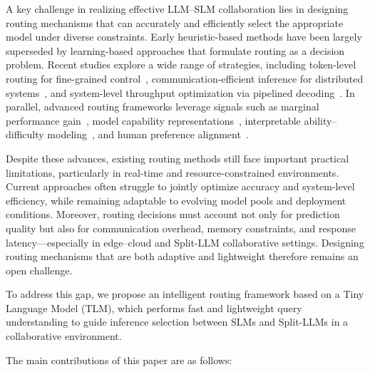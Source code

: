 \documentclass[lettersize,journal]{IEEEtran}
\begin{document}
A key challenge in realizing effective LLM–SLM collaboration lies in designing routing mechanisms that can accurately and efficiently select the appropriate model under diverse constraints. Early heuristic-based methods have been largely superseded by learning-based approaches that formulate routing as a decision problem. Recent studies explore a wide range of strategies, including token-level routing for fine-grained control~\cite{WZheng2025}, communication-efficient inference for distributed systems~\cite{CZheng2026}, and system-level throughput optimization via pipelined decoding~\cite{Xu2026}. In parallel, advanced routing frameworks leverage signals such as marginal performance gain~\cite{Luo2026}, model capability representations~\cite{Wang2026}, interpretable ability–difficulty modeling~\cite{Song2025}, and human preference alignment~\cite{Ong2025,Tran2025}.

Despite these advances, existing routing methods still face important practical limitations, particularly in real-time and resource-constrained environments. Current approaches often struggle to jointly optimize accuracy and system-level efficiency, while remaining adaptable to evolving model pools and deployment conditions. Moreover, routing decisions must account not only for prediction quality but also for communication overhead, memory constraints, and response latency—especially in edge–cloud and Split-LLM collaborative settings. Designing routing mechanisms that are both adaptive and lightweight therefore remains an open challenge.

To address this gap, we propose an intelligent routing framework based on a Tiny Language Model (TLM), which performs fast and lightweight query understanding to guide inference selection between SLMs and Split-LLMs in a collaborative environment.

The main contributions of this paper are as follows:
\end{document}
